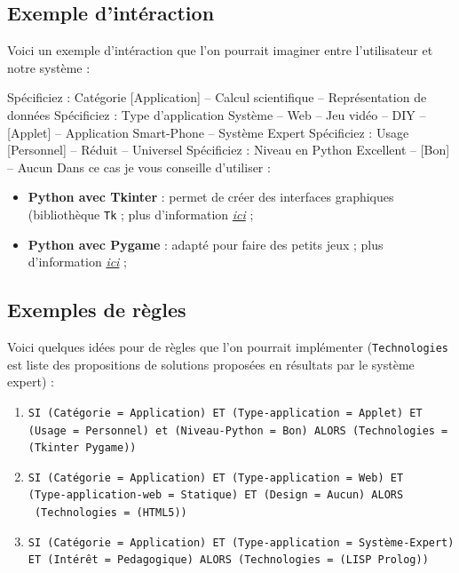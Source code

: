 \documentclass[a4paper,12pt]{article}
\begin{document}
\subsection{Exemple d'intéraction}

Voici un exemple d'intéraction que l'on pourrait imaginer entre l'utilisateur et notre système :

\begin{dialogue}
     Spécificiez : Catégorie
     [Application] --  Calcul scientifique -- Représentation de données
     Spécificiez : Type d'application
     Système -- Web -- Jeu vidéo -- DIY -- [Applet] -- Application Smart-Phone -- Système Expert
      Spécificiez : Usage
     [Personnel] -- Réduit -- Universel
     Spécificiez : Niveau en Python
     Excellent -- [Bon] -- Aucun
     Dans ce cas je vous conseille d'utiliser :
    \begin{itemize}
        \item \textbf{Python avec Tkinter} : permet de créer des interfaces graphiques (bibliothèque \texttt{Tk} ; plus d'information \href{https://wiki.python.org/moin/TkInter}{\textit{ici}} ;
        \item \textbf{Python avec Pygame} : adapté pour faire des petits jeux ; plus d'information \href{http://www.pygame.org/hifi.html}{\textit{ici}} ;
    \end{itemize}
\end{dialogue}


\subsection{Exemples de règles}

    Voici quelques idées pour de règles que l'on pourrait implémenter (\texttt{Technologies} est liste des propositions de solutions proposées en résultats par le système expert) :
    
    
    \begin{enumerate}
        \item     \texttt{SI (Catégorie = Application) ET (Type-application = Applet) ET\\ (Usage = Personnel) et (Niveau-Python = Bon) ALORS (Technologies = (Tkinter Pygame))}
        \item     \texttt{SI (Catégorie = Application) ET (Type-application = Web) ET\\ (Type-application-web = Statique) ET (Design = Aucun) ALORS\\\ (Technologies = (HTML5))}
        \item     \texttt{SI (Catégorie = Application) ET (Type-application = Système-Expert) ET (Intérêt = Pedagogique) ALORS (Technologies = (LISP Prolog))}
    \end{enumerate}
	
\end{document}
